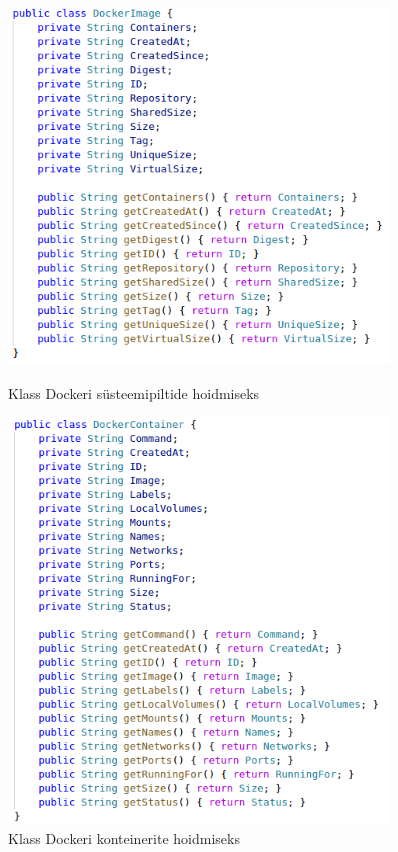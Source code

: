 \documentclass[12pt]{article}
\begin{document}
 \begin{figure}
  \centering
  \begin{minipage}{0.45\textwidth}
    \centering
    \includegraphics[width=0.9\textwidth]{dockerdriver_dockerimage} %
    \caption{Klass Dockeri süsteemipiltide hoidmiseks}
    \label{fig:dockerdriver_dockerimage}
  \end{minipage}\hfill
  \begin{minipage}{0.45\textwidth}
    \centering
    \includegraphics[width=0.9\textwidth]{dockerdriver_dockercontainer} %
    \caption{Klass Dockeri konteinerite hoidmiseks}
    \label{fig:dockerdriver_dockercontainer}
  \end{minipage}
 \end{figure}
\end{document}
